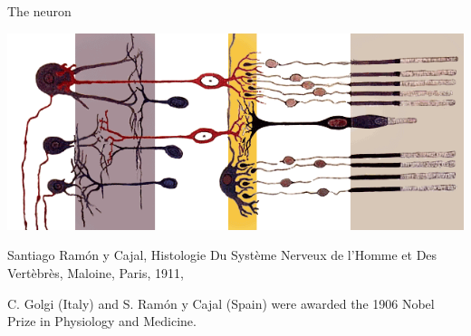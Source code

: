 \documentclass{beamer}
\begin{document}
\begin{frame}{The neuron}
\begin{multicols}{3}
\columnbreak

\includegraphics[scale=0.18]{pics/Fig_retine.png}

Santiago Ram\'on y Cajal, Histologie Du Syst\`eme Nerveux de l'Homme et Des Vert\`ebr\`es, Maloine, Paris, 1911, 
\end{multicols}

C. Golgi (Italy) and S. Ram\'on y Cajal (Spain) were awarded the 1906 Nobel Prize in Physiology and Medicine. 
\end{frame}
\end{document}

